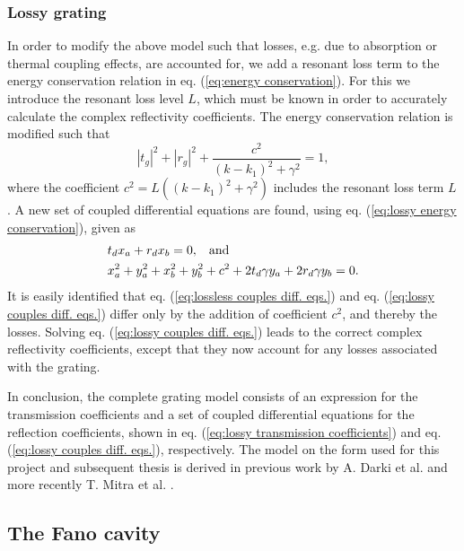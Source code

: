 \subsubsection{Lossy grating}

In order to modify the above model such that losses, e.g. due to absorption or thermal coupling effects, are accounted for, we add a resonant loss term to the energy conservation relation in eq. (\ref{eq:energy conservation}). For this we introduce the resonant loss level $L$, which must be known in order to accurately calculate the complex reflectivity coefficients. The energy conservation relation is modified such that
\begin{equation}
    |t_g|^2 + |r_g|^2 + \frac{c^2}{(k - k_1)^2 + \gamma^2} = 1,
    \label{eq:lossy energy conservation}
\end{equation}
where the coefficient $c^2 = L((k-k_1)^2 + \gamma^2)$ includes the resonant loss term $L$. A new set of coupled differential equations are found, using eq. (\ref{eq:lossy energy conservation}), given as
\begin{equation}
    \begin{split}
        &t_d x_a + r_d x_b = 0, \hspace{0.3cm} \text{and} \\
        &x_a^2 + y_a^2 + x_b^2 + y_b^2 + c^2 +  2 t_d \gamma y_a + 2 r_d \gamma y_b = 0.
    \end{split}
    \label{eq:lossy couples diff. eqs.}
\end{equation}
It is easily identified that eq. (\ref{eq:lossless couples diff. eqs.}) and eq. (\ref{eq:lossy couples diff. eqs.}) differ only by the addition of coefficient $c^2$, and thereby the losses. Solving eq. (\ref{eq:lossy couples diff. eqs.}) leads to the correct complex reflectivity coefficients, except that they now account for any losses associated with the grating. 

In conclusion, the complete grating model consists of an expression for the transmission coefficients and a set of coupled differential equations for the reflection coefficients, shown in eq. (\ref{eq:lossy transmission coefficients}) and eq. (\ref{eq:lossy couples diff. eqs.}), respectively. The model on the form used for this project and subsequent thesis is derived in previous work by A. Darki et al. \cite{Darki} and more recently T. Mitra et al. \cite{Mitra}.

\newpage
\subsection{The Fano cavity}

